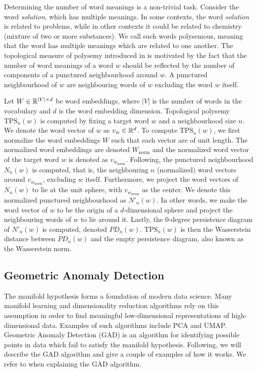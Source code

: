 Determining the number of word meanings is a non-trivial task. Consider the word \textit{solution}, which has multiple meanings. In some contexts, the word \textit{solution} is related to problems, while in other contexts it could be related to chemistry (mixture of two or more substances). We call such words polysemous, meaning that the word has multiple meanings which are related to one another. The topological measure of polysemy introduced in \cite{jakubowski2020topology} is motivated by the fact that the number of word meanings of a word $w$ should be reflected by the number of components of a punctured neighbourhood around $w$. A punctured neighbourhood of $w$ are neighbouring words of $w$ excluding the word $w$ itself.

Let $W \in \mathbb{R}^{|V| \times d}$ be word embeddings, where $|V|$ is the number of words in the vocabulary and $d$ is the word embedding dimension. Topological polysemy $\text{TPS}_n(w)$ is computed by fixing a target word $w$ and a neighbourhood size $n$. We denote the word vector of $w$ as $v_w \in \mathbb{R}^{d}$. To compute $\text{TPS}_n(w)$, we first normalize the word embeddings $W$ such that each vector are of unit length. The normalized word embeddings are denoted $W_\text{norm}$ and the normalized word vector of the target word $w$ is denoted as $v_{w_{\text{norm}}}$. Following, the punctured neighbourhood $N_n(w)$ is computed, that is, the neighbouring $n$ (normalized) word vectors around $v_{w_{\text{norm}}}$, excluding $w$ itself. Furthermore, we project the word vectors of $N_n(w)$ to lie at the unit sphere, with $v_{w_{\text{norm}}}$ as the center. We denote this normalized punctured neighbourhood as $N'_n(w)$. In other words, we make the word vector of $w$ to be the origin of a $d$-dimensional sphere and project the neighbouring words of $w$ to lie around it. Lastly, the 0-degree persistence diagram of $N'_n(w)$ is computed, denoted $PD_n(w)$. $\text{TPS}_n(w)$ is then the Wasserstein distance between $PD_n(w)$ and the empty persistence diagram, also known as the Wasserstein norm.

\subsection{Geometric Anomaly Detection}
\label{sec:geometric-anomaly-detection}
The manifold hypothesis forms a foundation of modern data science. Many manifold learning and dimensionality reduction algorithms rely on this assumption in order to find meaningful low-dimensional representations of high-dimensional data. Examples of such algorithms include PCA and UMAP. Geometric Anomaly Detection (GAD) \cite{stolz2020geometric} is an algorithm for identifying possible points in data which fail to satisfy the manifold hypothesis. Following, we will describe the GAD algorithm and give a couple of examples of how it works. We refer to \cite{stolz2020geometric} when explaining the GAD algorithm.

